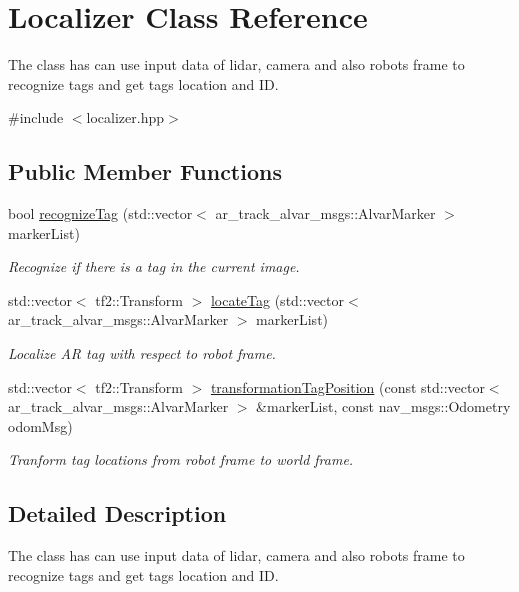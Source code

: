 \hypertarget{classLocalizer}{}\section{Localizer Class Reference}
\label{classLocalizer}


The class has can use input data of lidar, camera and also robot\textquotesingle{}s frame to recognize tags and get tags\textquotesingle{} location and ID.  




{\ttfamily \#include $<$localizer.\+hpp$>$}

\subsection*{Public Member Functions}
\begin{DoxyCompactItemize}
\item 
bool \hyperlink{classLocalizer_a02a645fc1f78ab10d1285fd494d8532a}{recognize\+Tag} (std\+::vector$<$ ar\+\_\+track\+\_\+alvar\+\_\+msgs\+::\+Alvar\+Marker $>$ marker\+List)
\begin{DoxyCompactList}\small\item\em Recognize if there is a tag in the current image. \end{DoxyCompactList}\item 
std\+::vector$<$ tf2\+::\+Transform $>$ \hyperlink{classLocalizer_a81d7f1b936ab815a58f7432c2b389ebc}{locate\+Tag} (std\+::vector$<$ ar\+\_\+track\+\_\+alvar\+\_\+msgs\+::\+Alvar\+Marker $>$ marker\+List)
\begin{DoxyCompactList}\small\item\em Localize AR tag with respect to robot frame. \end{DoxyCompactList}\item 
std\+::vector$<$ tf2\+::\+Transform $>$ \hyperlink{classLocalizer_a4f2090e02e67ca68cf60e0be5d54f8b6}{transformation\+Tag\+Position} (const std\+::vector$<$ ar\+\_\+track\+\_\+alvar\+\_\+msgs\+::\+Alvar\+Marker $>$ \&marker\+List, const nav\+\_\+msgs\+::\+Odometry odom\+Msg)
\begin{DoxyCompactList}\small\item\em Tranform tag locations from robot frame to world frame. \end{DoxyCompactList}\end{DoxyCompactItemize}


\subsection{Detailed Description}
The class has can use input data of lidar, camera and also robot\textquotesingle{}s frame to recognize tags and get tags\textquotesingle{} location and ID. 

